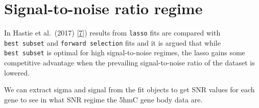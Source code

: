 \documentclass[
]{book}
\newenvironment{Shaded}{\begin{snugshade}}{\end{snugshade}}
\newcommand{\CommentTok}[1]{\textcolor[rgb]{0.56,0.35,0.01}{\textit{#1}}}
\newcommand{\DecValTok}[1]{\textcolor[rgb]{0.00,0.00,0.81}{#1}}
\newcommand{\FloatTok}[1]{\textcolor[rgb]{0.00,0.00,0.81}{#1}}
\newcommand{\KeywordTok}[1]{\textcolor[rgb]{0.13,0.29,0.53}{\textbf{#1}}}
\newcommand{\NormalTok}[1]{#1}
\newcommand{\OperatorTok}[1]{\textcolor[rgb]{0.81,0.36,0.00}{\textbf{#1}}}
\newcommand{\StringTok}[1]{\textcolor[rgb]{0.31,0.60,0.02}{#1}}
\begin{document}
\hypertarget{snr-regime}{%
\section{Signal-to-noise ratio regime}\label{snr-regime}}

In Hastie et al.~(2017) {[}\protect\hyperlink{ref-Hastie:2017aa}{7}{]}) results from \texttt{lasso} fits are
compared with \texttt{best\ subset} and \texttt{forward\ selection} fits and it is argued
that while \texttt{best\ subset} is optimal for high signal-to-noise regimes,
the lasso gains some competitive advantage when the prevailing signal-to-noise
ratio of the dataset is lowered.

We can extract sigma and signal from the fit objects to get SNR values for each gene
to see in what SNR regime the 5hmC gene body data are.

\begin{Shaded}
\end{Shaded}
\end{document}
